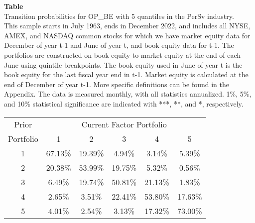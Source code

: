 \begin{table*}[ht!]
\raggedright
{}
\label{tab: transition_probs_OP_BE_PerSv_with_5_quantiles}
\textbf{Table \thetable} \\
Transition probabilities for OP_BE with 5 quantiles in the PerSv industry. \\
\hspace*{1em}This sample starts in July 1963, ends in December 2022, and includes all NYSE, AMEX, and NASDAQ common stocks for which we have market equity data for December of year t-1 and June of year t, and book equity data for t-1. The portfolios are constructed on book equity to market equity at the end of each June using quintile breakpoints.  The book equity used in June of year t is the book equity for the last fiscal year end in t-1.  Market equity is calculated at the end of December of year t-1.  More specific definitions can be found in the Appendix.  The data is measured monthly, with all statistics annualized.  1\%, 5\%, and 10\% statistical significance are indicated with ***, **, and *, respectively. \\
\vspace{0.5em}
\centering
\begin{adjustbox}{max width=\textwidth}
\begin{tabular}{@{}cccccc@{}}
\toprule
Prior & \multicolumn{5}{c}{Current Factor Portfolio} \\
Portfolio & 1 & 2 & 3 & 4 & 5 \\
\midrule
1 & 67.13\% & 19.39\% & 4.94\% & 3.14\% & 5.39\% \\
2 & 20.38\% & 53.99\% & 19.75\% & 5.32\% & 0.56\% \\
3 & 6.49\% & 19.74\% & 50.81\% & 21.13\% & 1.83\% \\
4 & 2.65\% & 3.51\% & 22.41\% & 53.80\% & 17.63\% \\
5 & 4.01\% & 2.54\% & 3.13\% & 17.32\% & 73.00\% \\
\bottomrule
\end{tabular}
\end{adjustbox}
\end{table*}